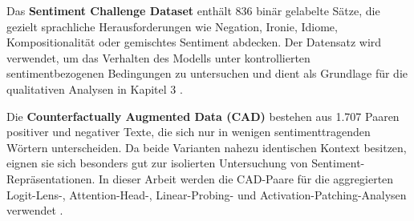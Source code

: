 Das \textbf{Sentiment Challenge Dataset} enthält 836 binär gelabelte Sätze, die gezielt sprachliche Herausforderungen wie Negation, Ironie, Idiome, Kompositionalität oder gemischtes Sentiment abdecken. Der Datensatz wird verwendet, um das Verhalten des Modells unter kontrollierten sentimentbezogenen Bedingungen zu untersuchen und dient als Grundlage für die qualitativen Analysen in Kapitel 3 \cite{barnes2019sentiment}. \par

Die \textbf{Counterfactually Augmented Data (CAD)} bestehen aus 1.707 Paaren positiver und negativer Texte, die sich nur in wenigen sentimenttragenden Wörtern unterscheiden. Da beide Varianten nahezu identischen Kontext besitzen, eignen sie sich besonders gut zur isolierten Untersuchung von Sentiment-Repräsentationen. In dieser Arbeit werden die CAD-Paare für die aggregierten Logit-Lens-, Attention-Head-, Linear-Probing- und Activation-Patching-Analysen verwendet \cite{kaushik2020learning}.
